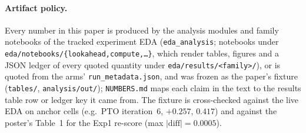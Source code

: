 \paragraph{Artifact policy.} Every number in this paper is produced by the analysis modules and
family notebooks of the tracked experiment EDA (\texttt{eda\_analysis}; notebooks under
\texttt{eda/notebooks/\{lookahead,compute,\ldots\}}, which render tables, figures and a JSON
ledger of every quoted quantity under \texttt{eda/results/<family>/}), or is quoted from the arms'
\texttt{run\_metadata.json}, and was frozen as the paper's fixture (\texttt{tables/},
\texttt{analysis/out/}); \texttt{NUMBERS.md} maps each claim in the text to the results table row
or ledger key it came from. The fixture is cross-checked against the live EDA on anchor cells
(e.g.\ PTO \QQ{} iteration~6, $+0.257$, \dz{} $0.417$) and against the poster's Table~1 for the
Exp1 re-score (max $|\text{diff}| = 0.0005$).
